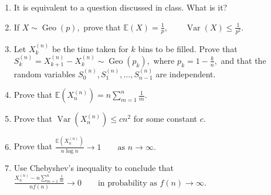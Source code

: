 \begin{quiz}

\begin{enumerate}

    \item It is equivalent to a question discussed in class.
    What is it?

    \item If
    \(
        X\sim\operatorname{Geo}(p),
    \)
    prove that
    \(
        \mathbb{E}(X)=\frac{1}{p},
        \qquad
        \operatorname{Var}(X)\leq\frac{1}{p^2}.
    \)

    \item Let $X_k^{(n)}$ be the time taken for $k$ bins to be
    filled. Prove that
    \(
        S_k^{(n)}
        =
        X_{k+1}^{(n)}-X_k^{(n)}
        \sim
        \operatorname{Geo}(p_k),
    \)
    where
    \(
        p_k=1-\frac{k}{n},
    \)
    and that the random variables
    \(
        S_0^{(n)},S_1^{(n)},\ldots,S_{n-1}^{(n)}
    \)
    are independent.

    \item Prove that
    \(
        \mathbb{E}\left(X_n^{(n)}\right)
        =
        n\sum_{m=1}^{n}\frac{1}{m}.
    \)

    \item Prove that
    \(
        \operatorname{Var}\left(X_n^{(n)}\right)
        \leq cn^2
    \)
    for some constant $c$.

    \item Prove that
    \(
        \frac{\mathbb{E}\left(X_n^{(n)}\right)}
        {n\log n}
        \longrightarrow 1
        \qquad\text{as }n\to\infty.
    \)

    \item Use Chebyshev's inequality to conclude that
    \(
        \frac{
            X_n^{(n)}
            -
            n\displaystyle\sum_{m=1}^{n}\frac{1}{m}
        }{
            nf(n)
        }
        \longrightarrow 0
        \qquad\text{in probability as }f(n)\to\infty.
    \)
\end{enumerate}

\end{quiz}

